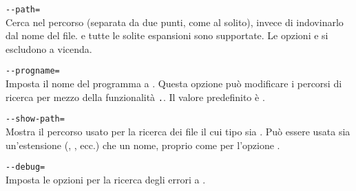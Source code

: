 \documentclass{article}
\begin{document}
\begin{ttdescription}
\item[\texttt{-{}-path=\var{stringa}}]\mbox{}\\
  Cerca nel percorso  (separata da due punti, come al
  solito), invece di indovinarlo dal nome del file. \samp{//} e tutte le
  solite espansioni sono supportate. Le opzioni  e
   si escludono a vicenda.

\item[\texttt{-{}-progname=\var{nome}}]\mbox{}\\
  Imposta il nome del programma a \texttt{}. Questa opzione può
  modificare i percorsi di ricerca per mezzo della funzionalità
  \texttt{.}. Il valore predefinito è
  .

\item[\texttt{-{}-show-path=\var{nome}}]\mbox{}\\
  Mostra il percorso usato per la ricerca dei file il cui tipo sia
  \texttt{}. Può essere usata sia un'estensione (,
  , ecc.) che un nome, proprio come per l'opzione
  .

\item[\texttt{-{}-debug=\var{num}}]\mbox{}\\
  Imposta le opzioni per la ricerca degli errori a \texttt{}.
\end{ttdescription}
\end{document}
